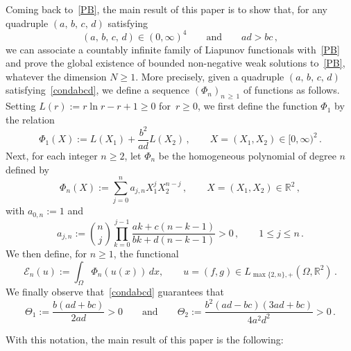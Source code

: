 \documentclass[AHL,Unicode,longabstracts,published]{cedram}
\newcommand{\bbR}{\mathbb{R}}
\newcommand{\clE}{\mathcal{E}}
\newcommand{\clE}{\mathcal{E}}
\begin{document}
Coming back to~\eqref{PB}, the main result of this paper is to show that, for any quadruple $(a,\, b,\, c,\, d)$ satisfying
\begin{equation}\label{condabcd}
(a,\, b,\, c,\, d) \in(0,\infty)^4 \qquad\text{and}\qquad ad>bc\,,
\end{equation}
we can associate a countably infinite family of Liapunov functionals with~\eqref{PB} and prove the global existence of bounded non-negative weak solutions to~\eqref{PB}, whatever the dimension $N\ge 1$. More precisely, given a quadruple $(a,\, b,\, c,\, d)$ satisfying~\eqref{condabcd}, we define a sequence $(\Phi_n)_{n\,\ge\,1}$ of functions as follows. Setting $L(r):=r\ln{r}-r+1\ge 0$ for~$r\ge 0$, we first define the function $\Phi_1$ by the relation
\begin{equation}\label{p4d}
\Phi_1(X) := L(X_1) + \frac{b^2}{ad}L(X_2)\,, \qquad X=(X_1,X_2)\in [0,\infty)^2\,. 
\end{equation}
Next, for each integer $n\geq 2$, let $\Phi_n$ be the homogeneous polynomial of degree $n$ defined by
\begin{equation}\label{p4b}
\Phi_n(X) := \sum_{j=0}^n a_{j,n} X_1^j X_2^{n-j}\,, \qquad X=(X_1,X_2)\in \bbR^2\,, 
\end{equation}
with $a_{0,n}:=1$ and
\begin{equation}\label{p4c}
a_{j,n}:=\binom{n}{j} \prod_{k=0}^{j-1}\frac{ak+c(n-k-1)}{bk+d(n-k-1)}> 0\,,\qquad 1\leq j\leq n\,.
\end{equation}
We then define, for $n\ge 1$, the functional
\begin{equation}\label{p4}
\clE_n(u):=\int_{\Omega}\Phi_n(u(x))\, dx,\qquad u=(f,g)\in L_{\max\{2,n\},+}\left(\Omega,\bbR^2\right)\,.
\end{equation}
We finally observe that~\eqref{condabcd} guarantees that
\begin{equation}\label{constants}
\Theta_1:=\frac{b(ad+bc)}{2ad}>0\qquad\text{and}\qquad \Theta_2:=\frac{b^2(ad-bc)(3ad+bc)}{4a^2d^2}>0\,.
\end{equation}


With this notation, the main result of this paper is the following:
\end{document}
